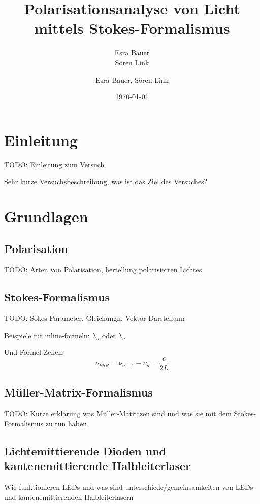 \documentclass[bigchapter,colorback,accentcolor=tud4b,linedtoc,11pt]{tudreport}
\title{Polarisationsanalyse von Licht mittels Stokes-Formalismus}
\subtitle{Esra Bauer  \\Sören Link}
\author{Esra Bauer, Sören Link}
\date{\today}
\numberwithin{equation}{subsection}
\begin{document}

\maketitle

\tableofcontents


\chapter{Einleitung}
TODO: Einleitung zum Versuch

Sehr kurze Versuchsbeschreibung, was ist das Ziel des Versuches?

\chapter{Grundlagen}
\section{Polarisation}
TODO: Arten von Polarisation, hertellung polarisierten Lichtes

\section{Stokes-Formalismus}
TODO: Sokes-Parameter, Gleichungn, Vektor-Darstellunn

Beispiele für inline-formeln: \(\lambda_n\) oder $\lambda_n$

Und Formel-Zeilen:
$$ \nu_{FSR} = \nu_{n+1} - \nu_n = \frac{c}{2L} $$


\section{Müller-Matrix-Formalismus}
TODO: Kurze erklärung was Müller-Matritzen sind und was sie mit dem Stokes-Formalismus zu tun haben


\section{Lichtemittierende Dioden und kantenemittierende Halbleiterlaser}
Wie funktionieren LEDs und was sind unterschiede/gemeinsamkeiten von LEDs und kantenemittierenden Halbleiterlasern
\end{document}
